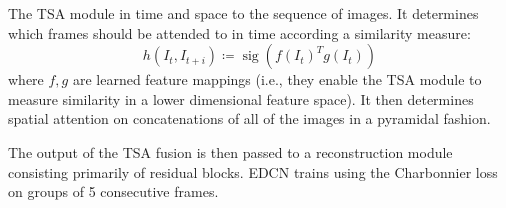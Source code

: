 The TSA module  in time and space to the sequence of images.
%
It determines which frames should be attended to in time according a similarity measure:
\begin{equation}
    h(I_t, I_{t+i}) \coloneqq \operatorname{sig} \left(f(I_t)^T g(I_t)\right)
\end{equation}
where \(f,g\) are learned feature mappings (i.e., they enable the TSA module to measure similarity in a lower dimensional feature space).
%
It then determines spatial attention on concatenations of all of the images in a pyramidal fashion.

The output of the TSA fusion is then passed to a reconstruction module consisting primarily of residual blocks.
%
EDCN trains using the Charbonnier loss on groups of 5 consecutive frames. 